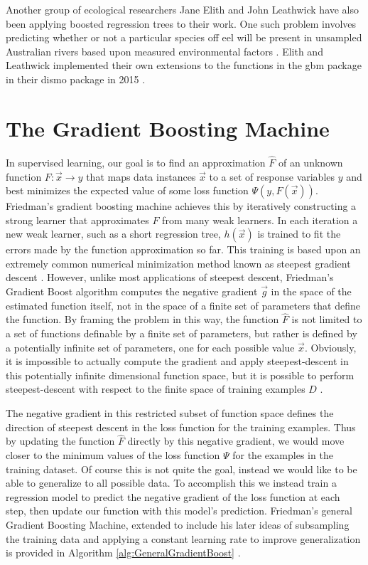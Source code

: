 \documentclass[conference]{IEEEtran}
\begin{document}
Another group of ecological researchers Jane Elith and John Leathwick have also been applying boosted regression trees to their work. One such problem involves predicting whether or not a particular species off eel will be present in unsampled Australian rivers based upon measured environmental factors \cite{ecological}.  Elith and Leathwick implemented their own extensions to the functions in the gbm package in their dismo package in 2015 \cite{elith2015boosted}. 


\section{The Gradient Boosting Machine}
\label{sec:GradientBoostingMachine}
In supervised learning, our goal is to find an approximation \(\hat{F}\) of an unknown function \(F: \vec{x} \rightarrow y\) that maps data instances \(\vec{x}\) to a set of response variables \(y\) and best minimizes the expected value of some loss function \( \Psi(y, F(\vec{x})) \). 
Friedman's gradient boosting machine achieves this by iteratively constructing a strong learner that approximates \(F\) from many weak learners. In each iteration a new weak learner, such as a short regression tree, \(h(\vec{x})\) is trained to fit the errors made by the function approximation so far. This training is based upon an extremely common numerical minimization method known as steepest gradient descent \cite{2012ridgeway} \cite{2001Friedman} . 
However, unlike most applications of steepest descent, Friedman's Gradient Boost algorithm computes the negative gradient \(\vec{g}\) in the space of the estimated function itself, not in the space of a finite set of parameters that define the function. By framing the problem in this way, the function \(\hat{F}\) is not limited to a set of functions definable by a finite set of parameters, but rather is defined by a potentially infinite set of parameters, one for each possible value \(\vec{x}\). Obviously, it is impossible to actually compute the gradient and apply steepest-descent in this potentially infinite dimensional function space, but it is possible to perform steepest-descent with respect to the finite space of training examples \(D\) \cite{2012ridgeway} \cite{2001Friedman}. 

The negative gradient in this restricted subset of function space defines the direction of steepest descent in the loss function for the training examples. Thus by updating the function \(\hat{F}\) directly by this negative gradient, we would move closer to the minimum values of the loss function \(\Psi\) for the examples in the training dataset. Of course this is not quite the goal, instead we would like to be able to generalize to all possible data. To accomplish this we instead train a regression model to predict the negative gradient of the loss function at each step, then update our function with this model's prediction. Friedman's general Gradient Boosting Machine, extended to include his later ideas of subsampling the training data and applying a constant learning rate to improve generalization is provided in Algorithm \ref{alg:GeneralGradientBoost} \cite{2012ridgeway} \cite{2001Friedman} \cite{2002Friedman}. 
\end{document}
